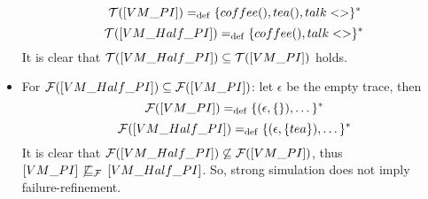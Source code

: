 \begin{prf}
\begin{itemize}
    \[\traces[VM\_PI] \define \{coffee(),tea(),talk<>\}^\ast\]
    \[\traces[VM\_Half\_PI] \define \{coffee(),talk<>\}^\ast\]
It is clear that $\traces[VM\_Half\_PI]\subseteq\traces[VM\_PI]$ holds. 

\item For $\failures[VM\_Half\_PI]\subseteq\failures[VM\_PI]$: let $\epsilon$ be the empty trace, then
    \[\failures[VM\_PI] \define \{(\epsilon,\{\}),\dots\}^\ast\]
    \[\failures[VM\_Half\_PI] \define \{(\epsilon,\{tea\}),\dots\}^\ast\]
It is clear that $\failures[VM\_Half\_PI]\not\subseteq\failures[VM\_PI]$, thus $\ec{VM\_PI} \not\refiF \ec{VM\_Half\_PI}$. So, strong simulation does not imply failure-refinement. 
\end{itemize}
\end{prf}
